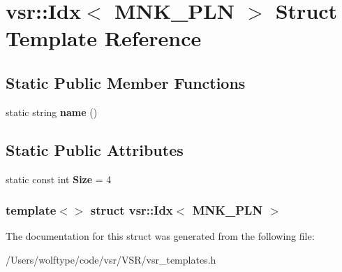 \hypertarget{structvsr_1_1_idx_3_01_m_n_k___p_l_n_01_4}{\section{vsr\-:\-:Idx$<$ M\-N\-K\-\_\-\-P\-L\-N $>$ Struct Template Reference}
\label{structvsr_1_1_idx_3_01_m_n_k___p_l_n_01_4}
}
\subsection*{Static Public Member Functions}
\begin{DoxyCompactItemize}
\item 
\hypertarget{structvsr_1_1_idx_3_01_m_n_k___p_l_n_01_4_a93234de625116f72eb399f7f3e2ec4db}{static string {\bfseries name} ()}\label{structvsr_1_1_idx_3_01_m_n_k___p_l_n_01_4_a93234de625116f72eb399f7f3e2ec4db}

\end{DoxyCompactItemize}
\subsection*{Static Public Attributes}
\begin{DoxyCompactItemize}
\item 
\hypertarget{structvsr_1_1_idx_3_01_m_n_k___p_l_n_01_4_a165a85258b560e73eda8cd7f228b4adc}{static const int {\bfseries Size} = 4}\label{structvsr_1_1_idx_3_01_m_n_k___p_l_n_01_4_a165a85258b560e73eda8cd7f228b4adc}

\end{DoxyCompactItemize}
\subsubsection*{template$<$$>$ struct vsr\-::\-Idx$<$ M\-N\-K\-\_\-\-P\-L\-N $>$}



The documentation for this struct was generated from the following file\-:\begin{DoxyCompactItemize}
\item 
/\-Users/wolftype/code/vsr/\-V\-S\-R/vsr\-\_\-templates.\-h\end{DoxyCompactItemize}
